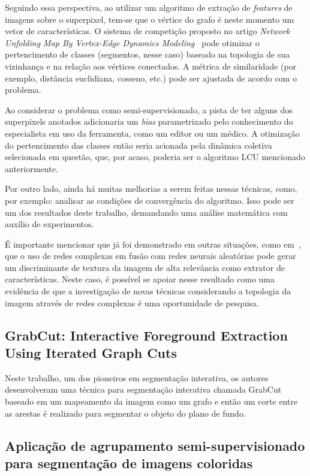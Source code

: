 Seguindo essa perspectiva, ao utilizar um algoritmo de extração de
\textit{features} de imagens sobre o superpixel, tem-se que o vértice
do grafo é neste momento um vetor de características. O sistema de
competição proposto no artigo \textit{Network Unfolding Map By
Vertex-Edge Dynamics Modeling}~\cite{VerriNetworkUnfoldingMap2018} pode otimizar o pertencimento de
classes (segmentos, nesse caso) baseado na topologia de sua vizinhança
e na relação aos vértices conectados. A métrica de similaridade
(por exemplo, distância euclidiana, cosseno, etc.) pode ser
ajustada de acordo com o problema.

Ao considerar o problema como semi-supervisionado, a pista de ter
alguns dos superpixels anotados adicionaria um \textit{bias}
parametrizado pelo conhecimento do especialista em uso da ferramenta,
como um editor ou um médico. A otimização do pertencimento das classes
então seria acionada pela dinâmica coletiva selecionada em questão,
que, por acaso, poderia ser o algoritmo \gls{LCU} mencionado anteriormente.

Por outro lado, ainda há muitas melhorias a serem feitas nessas técnicas, como,
por exemplo: analisar as condições de convergência do algoritmo. Isso
pode ser um dos resultados deste trabalho, demandando uma análise
matemática com auxílio de experimentos.

É importante mencionar que já foi demonstrado em outras situações,
como em~\cite{JarbasComplexNetworks2020}, que o uso de redes complexas
em fusão com redes neurais aleatórias pode gerar um discriminante de
textura da imagem de alta relevância como extrator de
características. Neste caso, é possível se apoiar nesse resultado como
uma evidência de que a investigação de novas técnicas considerando a
topologia da imagem através de redes complexas é uma oportunidade de
pesquisa.


\subsection{GrabCut: Interactive Foreground Extraction Using Iterated
  Graph Cuts}\label{sec:grabcut}

Neste trabalho, um dos pioneiros em segmentação interativa, os
autores~\cite{rother2004grabcut} desenvolveram uma técnica para segmentação interativa
chamada GrabCut baseado em um mapeamento da imagem como um grafo e
então um corte entre as arestas é realizado para segmentar o objeto do
plano de fundo.


\subsection{Aplicação de agrupamento semi-supervisionado para segmentação
  de imagens coloridas}\label{sec:franciscolira2018}

